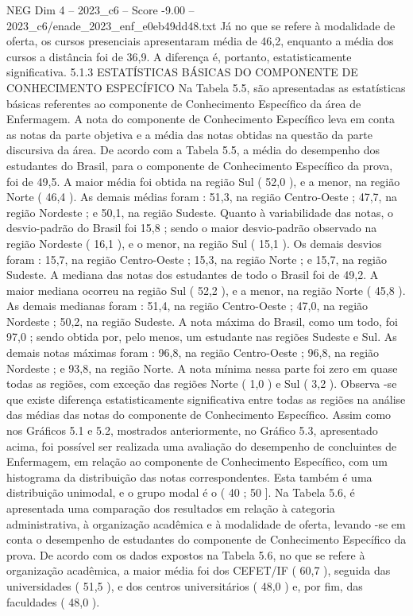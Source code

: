 \begin{textsample}{NEG Dim 4 – 2023\_c6 – Score -9.00 – 2023\_c6/enade\_2023\_enf\_e0eb49dd48.txt}
Já no que se refere à modalidade de oferta, os cursos presenciais apresentaram média de 46,2, enquanto a média dos cursos a distância foi de 36,9.
A diferença é, portanto, estatisticamente significativa. 5.1.3 ESTATÍSTICAS BÁSICAS DO COMPONENTE DE CONHECIMENTO ESPECÍFICO Na Tabela 5.5, são apresentadas as estatísticas básicas referentes ao componente de Conhecimento Específico da área de Enfermagem.
A nota do componente de Conhecimento Específico leva em conta as notas da parte objetiva e a média das notas obtidas na questão da parte discursiva da área.
De acordo com a Tabela 5.5, a média do desempenho dos estudantes do Brasil, para o componente de Conhecimento Específico da prova, foi de 49,5.
A maior média foi obtida na região Sul ( 52,0 ), e a menor, na região Norte ( 46,4 ).
As demais médias foram : 51,3, na região Centro-Oeste ; 47,7, na região Nordeste ; e 50,1, na região Sudeste.
Quanto à variabilidade das notas, o desvio-padrão do Brasil foi 15,8 ; sendo o maior desvio-padrão observado na região Nordeste ( 16,1 ), e o menor, na região Sul ( 15,1 ).
Os demais desvios foram : 15,7, na região Centro-Oeste ; 15,3, na região Norte ; e 15,7, na região Sudeste.
A mediana das notas dos estudantes de todo o Brasil foi de 49,2.
A maior mediana ocorreu na região Sul ( 52,2 ), e a menor, na região Norte ( 45,8 ).
As demais medianas foram : 51,4, na região Centro-Oeste ; 47,0, na região Nordeste ; 50,2, na região Sudeste.
A nota máxima do Brasil, como um todo, foi 97,0 ; sendo obtida por, pelo menos, um estudante nas regiões Sudeste e Sul.
As demais notas máximas foram : 96,8, na região Centro-Oeste ; 96,8, na região Nordeste ; e 93,8, na região Norte.
A nota mínima nessa parte foi zero em quase todas as regiões, com exceção das regiões Norte ( 1,0 ) e Sul ( 3,2 ).
Observa -se que existe diferença estatisticamente significativa entre todas as regiões na análise das médias das notas do componente de Conhecimento Específico.
Assim como nos Gráficos 5.1 e 5.2, mostrados anteriormente, no Gráfico 5.3, apresentado acima, foi possível ser realizada uma avaliação do desempenho de concluintes de Enfermagem, em relação ao componente de Conhecimento Específico, com um histograma da distribuição das notas correspondentes.
Esta também é uma distribuição unimodal, e o grupo modal é o ( 40 ; 50 ].
Na Tabela 5.6, é apresentada uma comparação dos resultados em relação à categoria administrativa, à organização acadêmica e à modalidade de oferta, levando -se em conta o desempenho de estudantes do componente de Conhecimento Específico da prova.
De acordo com os dados expostos na Tabela 5.6, no que se refere à organização acadêmica, a maior média foi dos CEFET/IF ( 60,7 ), seguida das universidades ( 51,5 ), e dos centros universitários ( 48,0 ) e, por fim, das faculdades ( 48,0 ).

\end{textsample}

